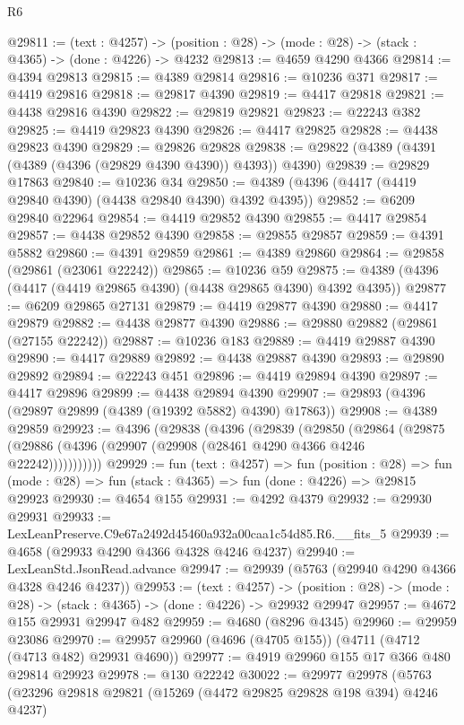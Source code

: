\begin{lexlean}{R6}
\begin{coremodule}
@29811 := (text : @4257) ->
  (position : @28) -> (mode : @28) -> (stack : @4365) -> (done : @4226) -> @4232
@29813 := @4659 @4290 @4366
@29814 := @4394 @29813
@29815 := @4389 @29814
@29816 := @10236 @371
@29817 := @4419 @29816
@29818 := @29817 @4390
@29819 := @4417 @29818
@29821 := @4438 @29816 @4390
@29822 := @29819 @29821
@29823 := @22243 @382
@29825 := @4419 @29823 @4390
@29826 := @4417 @29825
@29828 := @4438 @29823 @4390
@29829 := @29826 @29828
@29838 := @29822 (@4389 (@4391 (@4389 (@4396 (@29829 @4390 @4390)) @4393)) @4390)
@29839 := @29829 @17863
@29840 := @10236 @34
@29850 := @4389 (@4396 (@4417 (@4419 @29840 @4390) (@4438 @29840 @4390) @4392 @4395))
@29852 := @6209 @29840 @22964
@29854 := @4419 @29852 @4390
@29855 := @4417 @29854
@29857 := @4438 @29852 @4390
@29858 := @29855 @29857
@29859 := @4391 @5882
@29860 := @4391 @29859
@29861 := @4389 @29860
@29864 := @29858 (@29861 (@23061 @22242))
@29865 := @10236 @59
@29875 := @4389 (@4396 (@4417 (@4419 @29865 @4390) (@4438 @29865 @4390) @4392 @4395))
@29877 := @6209 @29865 @27131
@29879 := @4419 @29877 @4390
@29880 := @4417 @29879
@29882 := @4438 @29877 @4390
@29886 := @29880 @29882 (@29861 (@27155 @22242))
@29887 := @10236 @183
@29889 := @4419 @29887 @4390
@29890 := @4417 @29889
@29892 := @4438 @29887 @4390
@29893 := @29890 @29892
@29894 := @22243 @451
@29896 := @4419 @29894 @4390
@29897 := @4417 @29896
@29899 := @4438 @29894 @4390
@29907 := @29893 (@4396 (@29897 @29899 (@4389 (@19392 @5882) @4390) @17863))
@29908 := @4389 @29859
@29923 := @4396
    (@29838
      (@4396
        (@29839
          (@29850
            (@29864
              (@29875 (@29886 (@4396 (@29907 (@29908 (@28461 @4290 @4366 @4246 @22242)))))))))))
@29929 := fun (text : @4257) =>
  fun (position : @28) =>
  fun (mode : @28) => fun (stack : @4365) => fun (done : @4226) => @29815 @29923
@29930 := @4654 @155
@29931 := @4292 @4379
@29932 := @29930 @29931
@29933 := LexLeanPreserve.C9e67a2492d45460a932a00caa1c54d85.R6.__fits_5
@29939 := @4658 (@29933 @4290 @4366 @4328 @4246 @4237)
@29940 := LexLeanStd.JsonRead.advance
@29947 := @29939 (@5763 (@29940 @4290 @4366 @4328 @4246 @4237))
@29953 := (text : @4257) ->
  (position : @28) -> (mode : @28) -> (stack : @4365) -> (done : @4226) -> @29932 @29947
@29957 := @4672 @155 @29931 @29947 @482
@29959 := @4680 (@8296 @4345)
@29960 := @29959 @23086
@29970 := @29957 @29960 (@4696 (@4705 @155)) (@4711 (@4712 (@4713 @482) @29931 @4690))
@29977 := @4919 @29960 @155 @17 @366 @480 @29814 @29923
@29978 := @130 @22242
@30022 := @29977
    @29978
    (@5763
      (@23296
        @29818
        @29821
        (@15269 (@4472 @29825 @29828 @198 @394) @4246 @4237)

\end{coremodule}
\end{lexlean}
